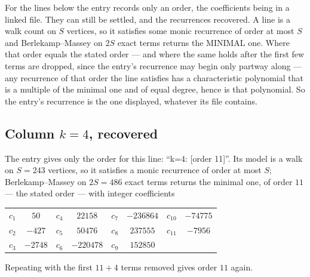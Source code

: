 \documentclass[11pt,a4paper]{article}
\theoremstyle{plain}
\theoremstyle{definition}
\begin{document}
For the lines below the entry records only an order, the coefficients being in a linked file.
They can still be settled, and the recurrences recovered. A line is a walk count on $S$
vertices, so it satisfies some monic recurrence of order at most $S$ and Berlekamp--Massey on
$2S$ exact terms returns the MINIMAL one. Where that order equals the stated order --- and
where the same holds after the first few terms are dropped, since the entry's recurrence may
begin only partway along --- any recurrence of that order the line satisfies has a
characteristic polynomial that is a multiple of the minimal one and of equal degree, hence is
that polynomial. So the entry's recurrence is the one displayed, whatever its file contains.

\subsection*{Column $k=4$, recovered}
The entry gives only the order for this line: ``k=4: [order 11]''. Its model is a walk on
$S=243$ vertices, so it satisfies a monic recurrence of order at most $S$;
Berlekamp--Massey on $2S=486$ exact terms returns the minimal one, of order
$11$ --- the stated order --- with integer coefficients
\begin{center}\small\begin{tabular}{cccccccc}
$c_{1}$ & $50$ & $c_{4}$ & $22158$ & $c_{7}$ & $-236864$ & $c_{10}$ & $-74775$ \\
$c_{2}$ & $-427$ & $c_{5}$ & $50476$ & $c_{8}$ & $237555$ & $c_{11}$ & $-7956$ \\
$c_{3}$ & $-2748$ & $c_{6}$ & $-220478$ & $c_{9}$ & $152850$ &  &  \\
\end{tabular}\end{center}
Repeating with the first $11+4$ terms removed gives order $11$ again.
\end{document}
